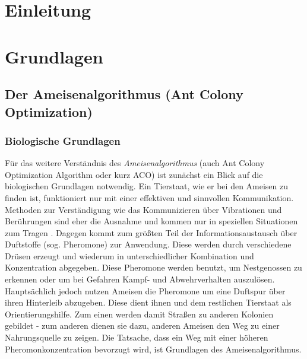 \documentclass[doktyp=barbeit, sprache=german]{TUBAFarbeiten}
\begin{document}
\maketitle
\tableofcontents
\newpage
\section{Einleitung}
\section{Grundlagen}
\subsection{Der Ameisenalgorithmus (Ant Colony Optimization)}
\subsubsection{Biologische Grundlagen}
Für das weitere Verständnis des \textit{Ameisenalgorithmus} (auch Ant Colony Optimization Algorithm oder kurz ACO) ist zunächst ein Blick auf die biologischen Grundlagen notwendig. Ein Tierstaat, wie er bei den Ameisen zu finden ist, funktioniert nur mit einer effektiven und sinnvollen Kommunikation. Methoden zur Verständigung wie das Kommunizieren über Vibrationen und Berührungen sind eher die Ausnahme und kommen nur in speziellen Situationen zum Tragen \cite{Ameisen}. Dagegen kommt zum größten Teil der Informationsaustausch über Duftstoffe (sog. Pheromone) zur Anwendung. Diese werden durch verschiedene Drüsen erzeugt und wiederum in unterschiedlicher Kombination und Konzentration abgegeben.
Diese Pheromone werden benutzt, um Nestgenossen zu erkennen oder um bei Gefahren Kampf- und Abwehrverhalten auszulösen. Hauptsächlich jedoch nutzen Ameisen die Pheromone um eine Duftspur über ihren Hinterleib abzugeben. Diese dient ihnen und dem restlichen Tierstaat als Orientierungshilfe. Zum einen werden damit Straßen zu anderen Kolonien gebildet - zum anderen dienen sie dazu, anderen Ameisen den Weg zu einer Nahrungsquelle zu zeigen. Die Tatsache, dass ein Weg mit einer höheren Pheromonkonzentration bevorzugt wird, ist Grundlagen des Ameisenalgorithmus.
\end{document}
